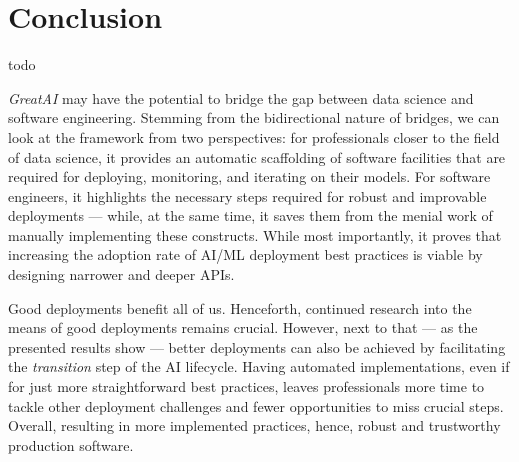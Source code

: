 \chapter{Conclusion}  \label{chapter:conclusion}

todo

\textit{GreatAI} may have the potential to bridge the gap between data science and software engineering. Stemming from the bidirectional nature of bridges, we can look at the framework from two perspectives: for professionals closer to the field of data science, it provides an automatic scaffolding of software facilities that are required for deploying, monitoring, and iterating on their models. For software engineers, it highlights the necessary steps required for robust and improvable deployments --- while, at the same time, it saves them from the menial work of manually implementing these constructs. While most importantly, it proves that increasing the adoption rate of AI/ML deployment best practices is viable by designing narrower and deeper APIs.

Good deployments benefit all of us. Henceforth, continued research into the means of good deployments remains crucial. However, next to that --- as the presented results show --- better deployments can also be achieved by facilitating the \textit{transition} step of the AI lifecycle. Having automated implementations, even if for just more straightforward best practices, leaves professionals more time to tackle other deployment challenges and fewer opportunities to miss crucial steps. Overall, resulting in more implemented practices, hence, robust and trustworthy production software.
